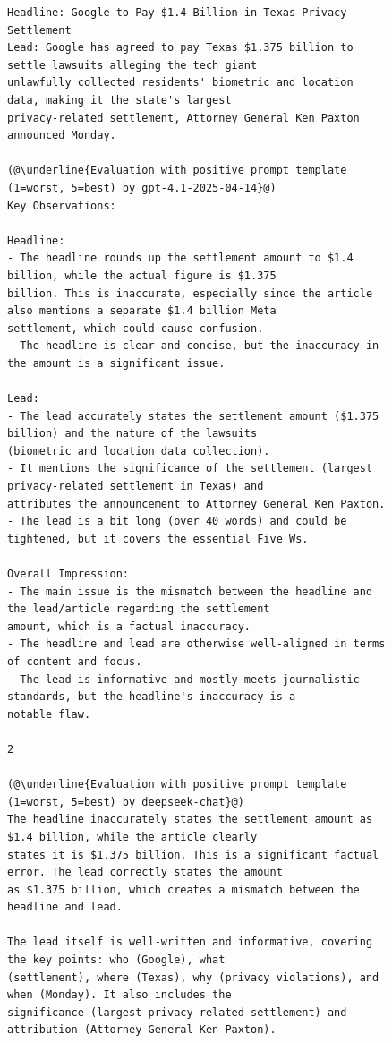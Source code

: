 \documentclass[UTF8,noindent,nohyp,parspace,titlepage,a4paper,12pt]{article}
\begin{document}
    \begin{figure}[!hbtp]
      \begin{lstlisting}[basicstyle=\fontsize{7pt}{8pt}\selectfont\sffamily,frame=single,linewidth=\textwidth]
Headline: Google to Pay $1.4 Billion in Texas Privacy Settlement
Lead: Google has agreed to pay Texas $1.375 billion to settle lawsuits alleging the tech giant
unlawfully collected residents' biometric and location data, making it the state's largest
privacy-related settlement, Attorney General Ken Paxton announced Monday.

(@\underline{Evaluation with positive prompt template (1=worst, 5=best) by gpt-4.1-2025-04-14}@)
Key Observations:

Headline:
- The headline rounds up the settlement amount to $1.4 billion, while the actual figure is $1.375
billion. This is inaccurate, especially since the article also mentions a separate $1.4 billion Meta
settlement, which could cause confusion.
- The headline is clear and concise, but the inaccuracy in the amount is a significant issue.

Lead:
- The lead accurately states the settlement amount ($1.375 billion) and the nature of the lawsuits
(biometric and location data collection).
- It mentions the significance of the settlement (largest privacy-related settlement in Texas) and
attributes the announcement to Attorney General Ken Paxton.
- The lead is a bit long (over 40 words) and could be tightened, but it covers the essential Five Ws.

Overall Impression:
- The main issue is the mismatch between the headline and the lead/article regarding the settlement
amount, which is a factual inaccuracy.
- The headline and lead are otherwise well-aligned in terms of content and focus.
- The lead is informative and mostly meets journalistic standards, but the headline's inaccuracy is a
notable flaw.

2

(@\underline{Evaluation with positive prompt template (1=worst, 5=best) by deepseek-chat}@)
The headline inaccurately states the settlement amount as $1.4 billion, while the article clearly
states it is $1.375 billion. This is a significant factual error. The lead correctly states the amount
as $1.375 billion, which creates a mismatch between the headline and lead.

The lead itself is well-written and informative, covering the key points: who (Google), what
(settlement), where (Texas), why (privacy violations), and when (Monday). It also includes the
significance (largest privacy-related settlement) and attribution (Attorney General Ken Paxton).


\end{lstlisting}
\end{figure}
\end{document}
